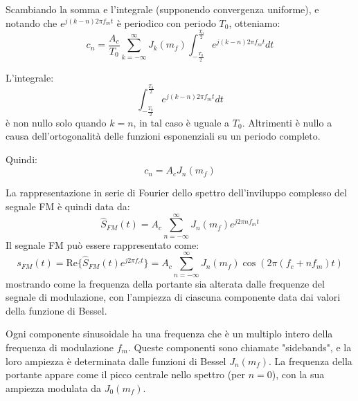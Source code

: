 Scambiando la somma e l'integrale (supponendo convergenza uniforme), e notando che \( e^{j (k-n) 2\pi f_m t} \) è periodico con periodo \( T_0 \), otteniamo:
\[ c_n = \frac{A_c}{T_0} \sum_{k=-\infty}^\infty J_k(m_f) \int_{-\frac{T_0}{2}}^{\frac{T_0}{2}} e^{j (k-n) 2\pi f_m t} dt \]



L'integrale:
\[ \int_{-\frac{T_0}{2}}^{\frac{T_0}{2}} e^{j (k-n) 2\pi f_m t} dt \]
è non nullo solo quando \( k = n \), in tal caso è uguale a \( T_0 \). Altrimenti è nullo a causa dell'ortogonalità delle funzioni esponenziali su un periodo completo.


Quindi:
\[ c_n = A_c J_n(m_f) \]





La rappresentazione in serie di Fourier dello spettro dell'inviluppo complesso del segnale FM è quindi data da:
\[
\hat{S}_{FM}(t) = A_c \sum_{n=-\infty}^{\infty} J_n(m_f) e^{j 2\pi n f_m t}
\]
Il segnale FM può essere rappresentato come:
\[
s_{FM}(t) = \text{Re}\{ \hat{S}_{FM}(t) e^{j 2\pi f_c t} \} = A_c \sum_{n=-\infty}^{\infty} J_n(m_f) \cos(2\pi (f_c + n f_m) t)
\]
mostrando come la frequenza della portante sia alterata dalle frequenze del segnale di modulazione, con l'ampiezza di ciascuna componente data dai valori della funzione di Bessel.

Ogni componente sinusoidale ha una frequenza che è un multiplo intero della frequenza di modulazione \( f_m \).
Queste componenti sono chiamate "sidebands", e la loro ampiezza è determinata dalle funzioni di Bessel \( J_n(m_f) \).
La frequenza della portante appare come il picco centrale nello spettro (per \( n = 0 \)), con la sua ampiezza modulata da \( J_0(m_f) \).

